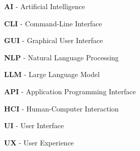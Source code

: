 \textbf{AI} - Artificial Intelligence

\textbf{CLI} - Command-Line Interface

\textbf{GUI} - Graphical User Interface

\textbf{NLP} - Natural Language Processing

\textbf{LLM} - Large Language Model

\textbf{API} - Application Programming Interface

\textbf{HCI} - Human-Computer Interaction

\textbf{UI} - User Interface

\textbf{UX} - User Experience

\gl
{}
{}
\gl
{}
{}


\gl
{}
{}

\gl
{}
{}

\gl
{}
{}


\gl
{}
{}


\gl
{}
{}

\gl
{}
{}
\gl
{}
{}


\gl
{}
{}

